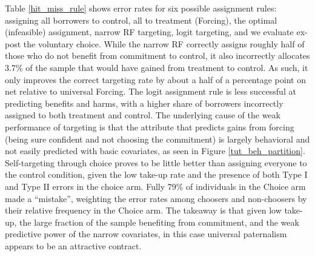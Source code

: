 \documentclass[oneside,11pt]{article}
\begin{document}
Table \ref{hit_miss_rule} shows error rates for six possible assignment rules: assigning all borrowers to control, all to treatment (Forcing), the optimal (infeasible) assignment, narrow RF targeting, logit targeting, and we evaluate ex-post the voluntary choice.  While the narrow RF correctly assigns roughly half of those who do not benefit from commitment to control, it also incorrectly allocates 3.7\% of the sample that would have gained from treatment to control. As such, it only improves the correct targeting rate by about a half of a percentage point on net relative to universal Forcing. The logit assignment rule is less successful at predicting benefits and harms, with a higher share of borrowers incorrectly assigned to both treatment and control. 
The underlying cause of the weak performance of targeting is that the attribute that predicts gains from forcing (being sure confident and not choosing the commitment) is largely behavioral and not easily predicted with basic covariates, as seen in Figure \ref{tut_beh_partition}. Self-targeting through choice proves to be little better than assigning everyone to the control condition, given the low take-up rate and the presence of both Type I and Type II errors in the choice arm. Fully 79\% of individuals in the Choice arm made a ``mistake'', weighting the error rates among choosers and non-choosers by their relative frequency in the Choice arm. The takeaway is that given low take-up, the large fraction of the sample benefiting from commitment, and the weak predictive power of the narrow covariates, in this case universal paternalism appears to be an attractive contract. 










\end{document}
